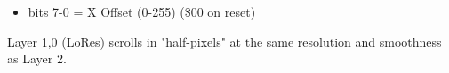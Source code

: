 \begin{itemize}
\item bits 7-0 = X Offset (0-255) (\$00 on reset)
\end{itemize}
Layer 1,0 (LoRes) scrolls in "half-pixels" at the same resolution and
smoothness as Layer 2.

